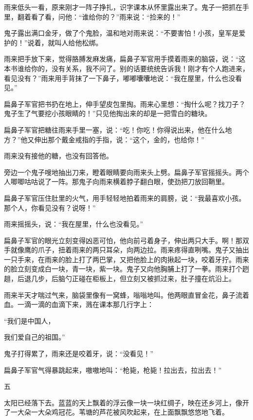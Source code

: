 \documentclass[12pt,UTF-8,openany]{ctexbook}
\begin{document}
\begin{large}
    雨来低头一看，原来刚才一阵子挣扎，识字课本从怀里露出来了。鬼子一把抓在手里，翻着看了看，问他：“谁给你的？”雨来说：“捡来的！”
    
    鬼子露出满口金牙，做了个鬼脸，温和地对雨来说：“不要害怕！小孩，皇军是爱护的！”说着，就叫人给他松绑。
    
    雨来把手放下来，觉得胳膊发麻发痛，扁鼻子军官用手摸着雨来的脑袋，说：“这本书谁给你的，没有关系，我不问了。别的话要统统告诉我！刚才有个人跑进来，看见没有？”雨来用手背抹了一下鼻子，嘟嘟囔囔地说：“我在屋里，什么也没看见。”
    
    扁鼻子军官把书扔在地上，伸手望皮包里掏。雨来心里想：“掏什么呢？找刀子？鬼子生了气要挖小孩眼睛的！”只见他掏出来的却是一把雪白的糖块。
    
    扁鼻子军官把糖往雨来手里一塞，说：“吃！你吃！你得说出来，他在什么地方？”他又伸出那个戴金戒指的手指，说：“这个，金的，也给你！”
    
    雨来没有接他的糖，也没有回答他。
    
    旁边一个鬼子嗖地抽出刀来，瞪着眼睛要向雨来头上劈。扁鼻子军官摇摇头。两个人唧唧咕咕说了一阵。那鬼子向雨来横着脖子翻白眼，使劲把刀放回鞘里。
    
    扁鼻子军官压住肚里的火气，用手轻轻地拍着雨来的肩膀，说：“我最喜欢小孩。那个人，你看见没有？说呀！”
    
    雨来摇摇头，说：“我在屋里，什么也没看见。”
    
    扁鼻子军官的眼光立刻变得凶恶可怕，他向前弓着身子，伸出两只大手。啊！那双手就像鹰的爪子，扭着雨来的两只耳朵，向两边拉。雨来疼得直咧嘴。鬼子又抽出一只手来，在雨来的脸上打了两巴掌，又把他脸上的肉揪起一块，咬着牙拧。雨来的脸立刻变成白一块，青一块，紫一块。鬼子又向他胸脯上打了一拳。雨来打个趔趄，后退几步，后脑勺正碰在柜板上，但立刻又被抓过来，肚子撞在炕沿上。
    
    雨来半天才喘过气来，脑袋里像有一窝蜂，嗡嗡地叫。他两眼直冒金花，鼻子流着血。一滴一滴的血滴下来，溅在课本那几行字上：
    
    “我们是中国人，
    
    我们爱自己的祖国。”
    
    鬼子打得累了，雨来还是咬着牙，说：“没看见！”
    
    扁鼻子军官气得暴跳起来，嗷嗷地叫：“枪毙，枪毙！拉出去，拉出去！”
    
    五
    
    太阳已经落下去。蓝蓝的天上飘着的浮云像一块一块红绸子，映在还乡河上，像开了一大朵一大朵鸡冠花。苇塘的芦花被风吹起来，在上面飘飘悠悠地飞着。
    

\end{large}
\end{document}
